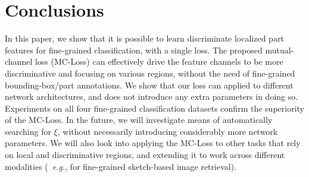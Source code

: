 \documentclass[journal]{IEEEtran}
\begin{document}
\section{Conclusions}\label{Conclusions}

In this paper, we show that it is possible to learn discriminate localized part features for fine-grained classification, with a single loss. The proposed mutual-channel loss (MC-Loss) can effectively drive the feature channels to be more discriminative and focusing on various regions, without the need of fine-grained bounding-box/part annotations. We show that our loss can applied to different network architectures, and does not introduce any extra parameters in doing so. Experiments on all four fine-grained classification datasets confirm the superiority of the MC-Loss. In the future, we will investigate means of automatically searching for $\xi$, without necessarily introducing considerably more network parameters. We will also look into applying the MC-Loss to other tasks that rely on local and discriminative regions, and extending it to work across different modalities (~\emph{e.g.}, for fine-grained sketch-based image retrieval).




















\ifCLASSOPTIONcaptionsoff
  \newpage
\fi









{\small


}
\end{document}
